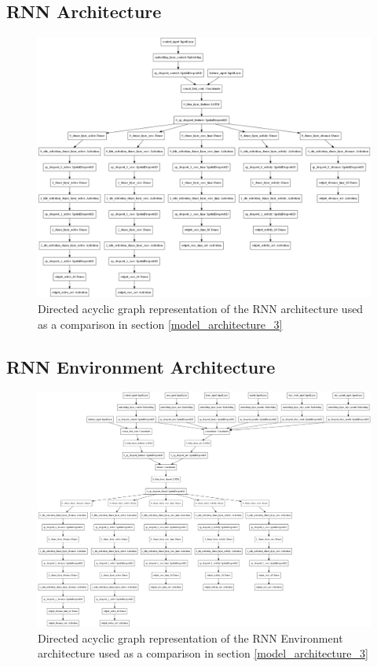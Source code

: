 \subsection{RNN Architecture}
\begin{figure}[H]
\centering
\includegraphics[width=\textwidth,height=0.7\textheight,keepaspectratio]{images/appendix_B/rnn_3.png}
\caption[\textbf{RNN DAG - Section \ref{model_architecture_3}}]{Directed acyclic graph representation of the RNN architecture used as a comparison in section \ref{model_architecture_3}}
\label{rnn_3_dag}
\end{figure}

\subsection{RNN Environment Architecture}
\begin{figure}[H]
\centering
\includegraphics[width=\textwidth,height=0.7\textheight,keepaspectratio]{images/appendix_B/rnn_env_3.png}
\caption[\textbf{RNN Environment DAG - Section \ref{model_architecture_3}}]{Directed acyclic graph representation of the RNN Environment architecture used as a comparison in section \ref{model_architecture_3}}
\label{rnn_env_dag}
\end{figure}

